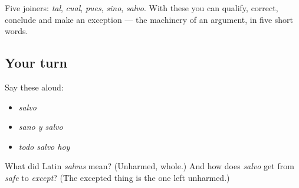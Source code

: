 \begin{grammarlens}[title={What you've built}]
Five joiners: \emph{tal}, \emph{cual}, \emph{pues}, \emph{sino}, \emph{salvo}. With these you can qualify, correct, conclude and make an exception — the machinery of an argument, in five short words.
\end{grammarlens}

\subsection*{Your turn}
Say these aloud:

\begin{itemize}
\raggedright
  \item \emph{salvo}
  \item \emph{sano y salvo}
  \item \emph{todo salvo hoy}
\end{itemize}

\begin{tcolorbox}[breakable,colback=teal!4,colframe=teal!35!black,title={Before you move on}]
What did Latin \emph{salvus} mean? (Unharmed, whole.) And how does \emph{salvo} get from \emph{safe} to \emph{except}? (The excepted thing is the one left unharmed.)
\end{tcolorbox}

